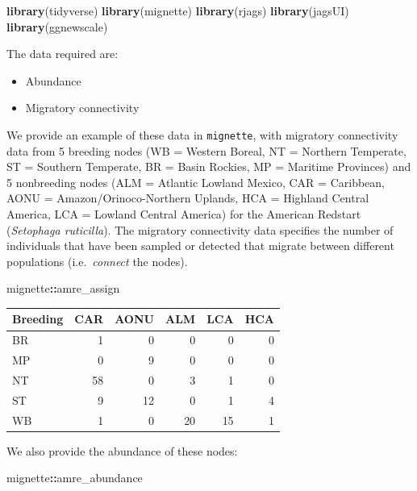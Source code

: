 \documentclass[
]{book}
\newenvironment{Shaded}{\begin{snugshade}}{\end{snugshade}}
\newcommand{\FunctionTok}[1]{\textcolor[rgb]{0.13,0.29,0.53}{\textbf{#1}}}
\newcommand{\NormalTok}[1]{#1}
\newcommand{\SpecialCharTok}[1]{\textcolor[rgb]{0.81,0.36,0.00}{\textbf{#1}}}
\providecommand{\tightlist}{%
  \setlength{\itemsep}{0pt}\setlength{\parskip}{0pt}}
\begin{document}
\begin{Shaded}
\begin{Highlighting}[]
\FunctionTok{library}\NormalTok{(tidyverse)}
\FunctionTok{library}\NormalTok{(mignette)}
\FunctionTok{library}\NormalTok{(rjags)}
\FunctionTok{library}\NormalTok{(jagsUI)}
\FunctionTok{library}\NormalTok{(ggnewscale)}
\end{Highlighting}
\end{Shaded}

The data required are:

\begin{itemize}
\tightlist
\item
  Abundance
\item
  Migratory connectivity
\end{itemize}

We provide an example of these data in \texttt{mignette}, with migratory connectivity data from 5 breeding nodes (WB = Western Boreal, NT = Northern Temperate, ST = Southern Temperate, BR = Basin Rockies, MP = Maritime Provinces) and 5 nonbreeding nodes (ALM = Atlantic Lowland Mexico, CAR = Caribbean, AONU = Amazon/Orinoco-Northern Uplands, HCA = Highland Central America, LCA = Lowland Central America) for the American Redstart (\emph{Setophaga ruticilla}). The migratory connectivity data specifies the number of individuals that have been sampled or detected that migrate between different populations (i.e.~\emph{connect} the nodes).

\begin{Shaded}
\begin{Highlighting}[]
\NormalTok{mignette}\SpecialCharTok{::}\NormalTok{amre\_assign}
\end{Highlighting}
\end{Shaded}

\begin{tabular}{l|r|r|r|r|r}
\hline
Breeding & CAR & AONU & ALM & LCA & HCA\\
\hline
BR & 1 & 0 & 0 & 0 & 0\\
\hline
MP & 0 & 9 & 0 & 0 & 0\\
\hline
NT & 58 & 0 & 3 & 1 & 0\\
\hline
ST & 9 & 12 & 0 & 1 & 4\\
\hline
WB & 1 & 0 & 20 & 15 & 1\\
\hline
\end{tabular}

We also provide the abundance of these nodes:

\begin{Shaded}
\begin{Highlighting}[]
\NormalTok{mignette}\SpecialCharTok{::}\NormalTok{amre\_abundance}
\end{Highlighting}
\end{Shaded}
\end{document}
